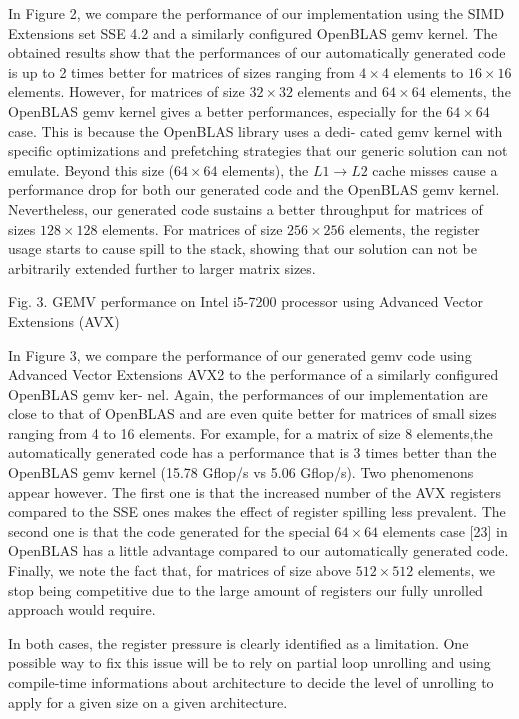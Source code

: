 \documentclass[../../main.tex]{subfiles}
\begin{document}
In Figure 2, we compare the performance of our implementation
using the SIMD Extensions set SSE 4.2 and a similarly
configured OpenBLAS gemv kernel. The obtained results show
that the performances of our automatically generated code is
up to 2 times better for matrices of sizes ranging from $4 \times 4$
elements to $16 \times 16$ elements. However, for matrices of size
$32 \times 32$ elements and $64 \times 64$ elements, the OpenBLAS gemv
kernel gives a better performances, especially for the $64 \times 64$
case. This is because the OpenBLAS library uses a dedi-
cated gemv kernel with specific optimizations and prefetching
strategies that our generic solution can not emulate. Beyond
this size ($64 \times 64$ elements), the $L1 \rightarrow L2$ cache misses
cause a performance drop for both our generated code and
the OpenBLAS gemv kernel. Nevertheless, our generated code
sustains a better throughput for matrices of sizes $128 \times 128$
elements. For matrices of size $256 \times 256$ elements, the register
usage starts to cause spill to the stack, showing that our
solution can not be arbitrarily extended further to larger matrix sizes.

Fig. 3. GEMV performance on Intel i5-7200 processor using Advanced Vector
Extensions (AVX)

In Figure 3, we compare the performance of our generated
gemv code using Advanced Vector Extensions AVX2 to the
performance of a similarly configured OpenBLAS gemv ker-
nel. Again, the performances of our implementation are close
to that of OpenBLAS and are even quite better for matrices of
small sizes ranging from 4 to 16 elements. For example, for a
matrix of size 8 elements,the automatically generated code has
a performance that is 3 times better than the OpenBLAS gemv
kernel (15.78 Gflop/s vs 5.06 Gflop/s). Two phenomenons
appear however. The first one is that the increased number
of the AVX registers compared to the SSE ones makes the
effect of register spilling less prevalent. The second one is
that the code generated for the special $64 \times 64$ elements
case [23] in OpenBLAS has a little advantage compared to
our automatically generated code. Finally, we note the fact
that, for matrices of size above $512 \times 512$ elements, we stop
being competitive due to the large amount of registers our
fully unrolled approach would require.

In both cases, the register pressure is clearly identified as a
limitation. One possible way to fix this issue will be to rely
on partial loop unrolling and using compile-time informations
about architecture to decide the level of unrolling to apply for
a given size on a given architecture.
\end{document}

